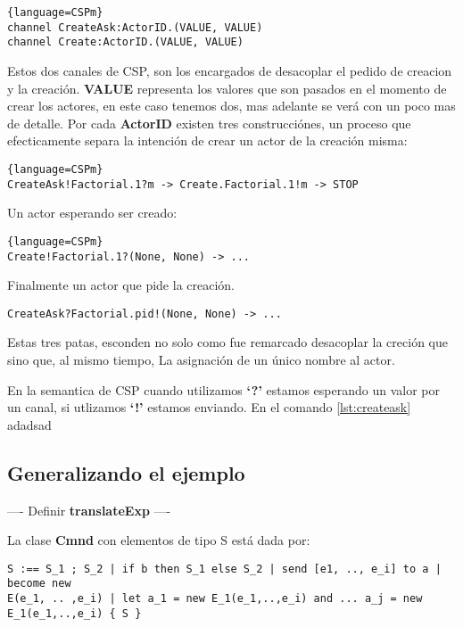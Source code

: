 \documentclass[fleqn]{article}
\begin{document}
\begin{lstlisting}{language=CSPm}
channel CreateAsk:ActorID.(VALUE, VALUE)
channel Create:ActorID.(VALUE, VALUE)
\end{lstlisting}

Estos dos canales de CSP, son los encargados de desacoplar el pedido de creacion
y la creación. \textbf{VALUE} representa los valores que son pasados en el
momento de crear los actores, en este caso tenemos dos, mas adelante se verá con
un poco mas de detalle.
Por cada \textbf{ActorID} existen tres construcciónes, un proceso que
efecticamente separa la intención de crear un actor de la creación misma:

\begin{lstlisting}{language=CSPm}
CreateAsk!Factorial.1?m -> Create.Factorial.1!m -> STOP
\end{lstlisting}

Un actor esperando ser creado:

\begin{lstlisting}{language=CSPm}
Create!Factorial.1?(None, None) -> ...
\end{lstlisting}

Finalmente un actor que pide la creación.

\begin{lstlisting}[label={lst:createask},language=CSPm]
  CreateAsk?Factorial.pid!(None, None) -> ...
\end{lstlisting}

Estas tres patas, esconden no solo como fue remarcado desacoplar la creción que
sino que, al mismo tiempo, La asignación de un único nombre al actor.

En la semantica de CSP cuando utilizamos \textbf{`?'} estamos esperando un valor
por un canal, si utlizamos \textbf{`!'} estamos enviando. En el comando
\ref{lst:createask} adadsad




\subsection{Generalizando el ejemplo}

---- Definir \textbf{translateExp}  ----

La clase \textbf{Cmnd} con elementos de tipo S está dada por:

\begin{verbatim}
S :== S_1 ; S_2 | if b then S_1 else S_2 | send [e1, .., e_i] to a | become new
E(e_1, .. ,e_i) | let a_1 = new E_1(e_1,..,e_i) and ... a_j = new
E_1(e_1,..,e_i) { S } 
\end{verbatim}
\end{document}
